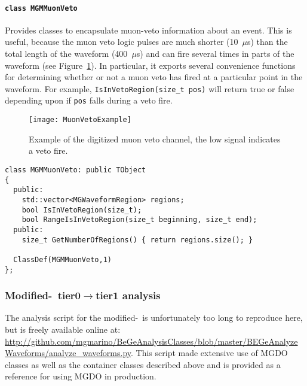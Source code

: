 				\paragraph{\lstinline!class MGMMuonVeto!}
Provides classes to encapsulate muon-veto information about an event.  This is useful, because the muon veto logic pulses are much shorter (10~$\mu$s) than the total length of the waveform (400~$\mu$s) and can fire several times in parts of the waveform (see Figure~\ref{fig:MuonVetoExample}).  In particular, it exports several convenience functions
for determining whether or not a muon veto has fired at a particular point in the waveform.  For example, \lstinline!IsInVetoRegion(size_t pos)! will return true or false depending upon if \lstinline!pos! falls during a veto fire.
					\begin{figure}
						\centering
						\texttt{[image: MuonVetoExample]}
						\caption[Example of the digitized muon veto channel.]
						{Example of the digitized muon veto channel, the low signal indicates a veto fire.}
						\label{fig:MuonVetoExample}
					\end{figure}
					\begin{lstlisting}
class MGMMuonVeto: public TObject
{
  public:
    std::vector<MGWaveformRegion> regions;
    bool IsInVetoRegion(size_t);
    bool RangeIsInVetoRegion(size_t beginning, size_t end);
  public:
    size_t GetNumberOfRegions() { return regions.size(); }
    
  ClassDef(MGMMuonVeto,1)
};
					\end{lstlisting}		
			\subsubsection{Modified-\bege~tier0\texorpdfstring{$\to$}{ to }tier1 analysis}	
The analysis script for the modified-\bege~is unfortunately too long to reproduce here, but is freely available online at:
\url{http://github.com/mgmarino/BeGeAnalysisClasses/blob/master/BEGeAnalyzeWaveforms/analyze_waveforms.py}.  This 
script made extensive use of MGDO classes as well as the container classes described above and is provided as a reference
for using MGDO in production.
					
